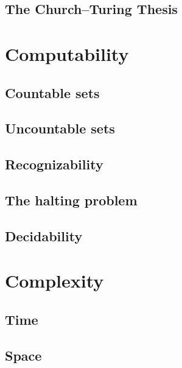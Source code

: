 \documentclass{book}
\begin{document}
\chapter{The Church--Turing Thesis}



\part{Computability} \label{prt:computability}


\chapter{Countable sets}



\chapter{Uncountable sets}



\chapter{Recognizability}



\chapter{The halting problem}



\chapter{Decidability}



\part{Complexity} \label{prt:complexity}


\chapter{Time}



\chapter{Space}


\end{document}
